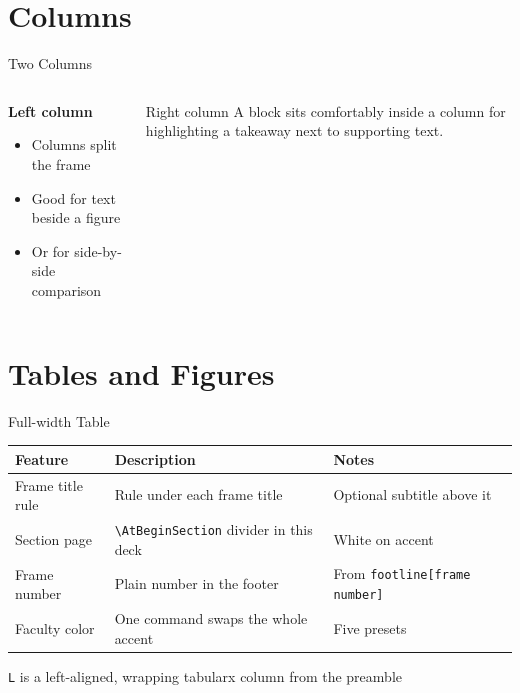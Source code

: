 \documentclass[aspectratio=169]{beamer}
\begin{document}
\section{Columns}

\begin{frame}{Two Columns}
    \begin{columns}[t]
        \begin{column}{0.48\textwidth}
            \textbf{Left column}
            \begin{itemize}
                \item Columns split the frame
                \item Good for text beside a figure
                \item Or for side-by-side comparison
            \end{itemize}
        \end{column}
        \begin{column}{0.48\textwidth}
            \begin{block}{Right column}
                A block sits comfortably inside a column for highlighting a
                takeaway next to supporting text.
            \end{block}
        \end{column}
    \end{columns}
\end{frame}

\section{Tables and Figures}

\begin{frame}{Full-width Table}
    \small
    \begin{tabularx}{\textwidth}{@{} l L L @{}}
        \toprule
        \textbf{Feature} & \textbf{Description} & \textbf{Notes} \\
        \midrule
        Frame title rule & Rule under each frame title & Optional subtitle above it \\[4pt]
        Section page     & \texttt{\textbackslash AtBeginSection} divider in this deck & White on accent \\[4pt]
        Frame number     & Plain number in the footer & From \texttt{footline[frame number]} \\[4pt]
        Faculty color    & One command swaps the whole accent & Five presets \\
        \bottomrule
    \end{tabularx}

    \vspace{2em}
    {\small\color{UUlmMutedBlack}%
        \texttt{L} is a left-aligned, wrapping tabularx column from the preamble
    }
\end{frame}
\end{document}
